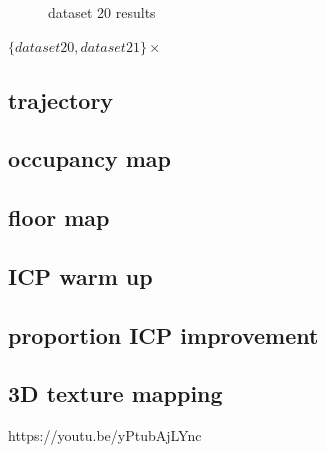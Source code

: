 \documentclass[conference]{IEEEtran}
\begin{document}
\begin{figure}[htbp]
    \caption{dataset 20 results}
    \label{fig:composite}
\end{figure}



$\{dataset 20, dataset 21\}\times{}$

\subsection{trajectory}

\subsection{occupancy map}

\subsection{floor map}

\appendix
\subsection{ICP warm up}

\subsection{proportion ICP improvement}


\subsection{3D texture mapping}
https://youtu.be/yPtubAjLYnc
\end{document}
